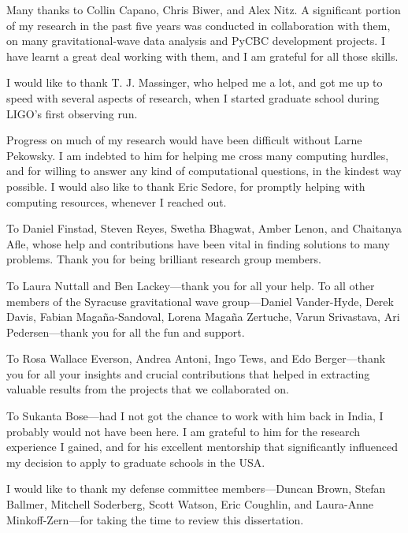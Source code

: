 Many thanks to Collin Capano, Chris Biwer, and Alex Nitz. A significant portion of my research in the past five years was conducted in collaboration with them, on many gravitational-wave data analysis and PyCBC development projects. I have learnt a great deal working with them, and I am grateful for all those skills.

I would like to thank T. J. Massinger, who helped me a lot, and got me up to speed with several aspects of research, when I started graduate school during LIGO's first observing run.

Progress on much of my research would have been difficult without Larne Pekowsky. I am indebted to him for helping me cross many computing hurdles, and for willing to answer any kind of computational questions, in the kindest way possible. I would also like to thank Eric Sedore, for promptly helping with computing resources, whenever I reached out.

To Daniel Finstad, Steven Reyes, Swetha Bhagwat, Amber Lenon, and Chaitanya Afle, whose help and contributions have been vital in finding solutions to many problems. Thank you for being brilliant research group members.

To Laura Nuttall and Ben Lackey---thank you for all your help. To all other members of the Syracuse gravitational wave group---Daniel Vander-Hyde, Derek Davis, Fabian Maga\~{n}a-Sandoval, Lorena Maga\~{n}a Zertuche, Varun Srivastava, Ari Pedersen---thank you for all the fun and support.

To Rosa Wallace Everson, Andrea Antoni, Ingo Tews, and Edo Berger---thank you for all your insights and crucial contributions that helped in extracting valuable results from the projects that we collaborated on.

To Sukanta Bose---had I not got the chance to work with him back in India, I probably would not have been here. I am grateful to him for the research experience I gained, and for his excellent mentorship that significantly influenced my decision to apply to graduate schools in the USA.

I would like to thank my defense committee members---Duncan Brown, Stefan Ballmer, Mitchell Soderberg, Scott Watson, Eric Coughlin, and Laura-Anne Minkoff-Zern---for taking the time to review this dissertation.

